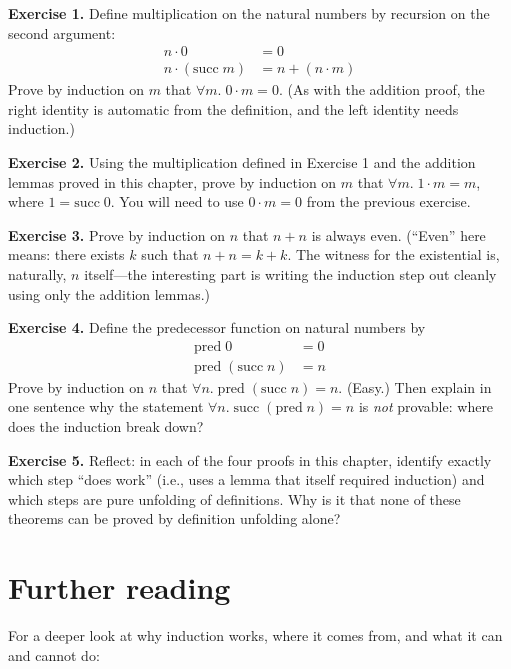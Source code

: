 \documentclass[11pt]{article}
\begin{document}
\bigskip
\textbf{Exercise 1.}\label{ex:induction:1} Define multiplication on the natural numbers by recursion on the second argument:
\begin{align*}
n \cdot 0 &= 0 \\
n \cdot (\text{succ}\; m) &= n + (n \cdot m)
\end{align*}
Prove by induction on $m$ that $\forall m.\; 0 \cdot m = 0$. (As with the addition proof, the right identity is automatic from the definition, and the left identity needs induction.)

\bigskip
\textbf{Exercise 2.}\label{ex:induction:2} Using the multiplication defined in Exercise 1 and the addition lemmas proved in this chapter, prove by induction on $m$ that $\forall m.\; 1 \cdot m = m$, where $1 = \text{succ}\; 0$. You will need to use $0 \cdot m = 0$ from the previous exercise.

\bigskip
\textbf{Exercise 3.}\label{ex:induction:3} Prove by induction on $n$ that $n + n$ is always even. (``Even'' here means: there exists $k$ such that $n + n = k + k$. The witness for the existential is, naturally, $n$ itself---the interesting part is writing the induction step out cleanly using only the addition lemmas.)

\bigskip
\textbf{Exercise 4.}\label{ex:induction:4} Define the predecessor function on natural numbers by
\begin{align*}
\text{pred}\;0 &= 0 \\
\text{pred}\;(\text{succ}\; n) &= n
\end{align*}
Prove by induction on $n$ that $\forall n.\; \text{pred}\;(\text{succ}\; n) = n$. (Easy.) Then explain in one sentence why the statement $\forall n.\; \text{succ}\;(\text{pred}\; n) = n$ is \emph{not} provable: where does the induction break down?

\bigskip
\textbf{Exercise 5.}\label{ex:induction:5} Reflect: in each of the four proofs in this chapter, identify exactly which step ``does work'' (i.e., uses a lemma that itself required induction) and which steps are pure unfolding of definitions. Why is it that none of these theorems can be proved by definition unfolding alone?

\section*{Further reading}

For a deeper look at why induction works, where it comes from, and what it can and cannot do:
\end{document}

